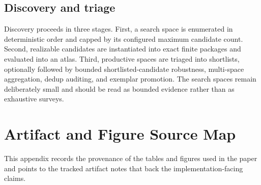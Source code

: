 \documentclass[11pt]{article}
\theoremstyle{definition}
\begin{document}
\subsection{Discovery and triage}\label{appsubsec:comp-discovery}
Discovery proceeds in three stages. First, a search space is enumerated in deterministic order and capped by its configured maximum candidate count. Second, realizable candidates are instantiated into exact finite packages and evaluated into an atlas. Third, productive spaces are triaged into shortlists, optionally followed by bounded shortlisted-candidate robustness, multi-space aggregation, dedup auditing, and exemplar promotion. The search spaces remain deliberately small and should be read as bounded evidence rather than as exhaustive surveys.

\section{Artifact and Figure Source Map}\label{app:artifact-map}
This appendix records the provenance of the tables and figures used in the paper and points to the tracked artifact notes that back the implementation-facing claims.
\end{document}
